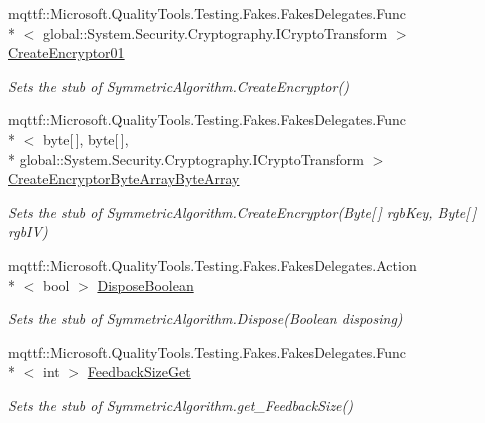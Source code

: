 \begin{DoxyCompactItemize}
mqttf\-::\-Microsoft.\-Quality\-Tools.\-Testing.\-Fakes.\-Fakes\-Delegates.\-Func\\*
$<$ global\-::\-System.\-Security.\-Cryptography.\-I\-Crypto\-Transform $>$ \hyperlink{class_system_1_1_security_1_1_cryptography_1_1_fakes_1_1_stub_symmetric_algorithm_a7e6e0267f843f233ed862731f70861bf}{Create\-Encryptor01}
\begin{DoxyCompactList}\small\item\em Sets the stub of Symmetric\-Algorithm.\-Create\-Encryptor()\end{DoxyCompactList}\item 
mqttf\-::\-Microsoft.\-Quality\-Tools.\-Testing.\-Fakes.\-Fakes\-Delegates.\-Func\\*
$<$ byte\mbox{[}$\,$\mbox{]}, byte\mbox{[}$\,$\mbox{]}, \\*
global\-::\-System.\-Security.\-Cryptography.\-I\-Crypto\-Transform $>$ \hyperlink{class_system_1_1_security_1_1_cryptography_1_1_fakes_1_1_stub_symmetric_algorithm_a988c4d07dd356c8d91f1b124d02994d0}{Create\-Encryptor\-Byte\-Array\-Byte\-Array}
\begin{DoxyCompactList}\small\item\em Sets the stub of Symmetric\-Algorithm.\-Create\-Encryptor(\-Byte\mbox{[}$\,$\mbox{]} rgb\-Key, Byte\mbox{[}$\,$\mbox{]} rgb\-I\-V)\end{DoxyCompactList}\item 
mqttf\-::\-Microsoft.\-Quality\-Tools.\-Testing.\-Fakes.\-Fakes\-Delegates.\-Action\\*
$<$ bool $>$ \hyperlink{class_system_1_1_security_1_1_cryptography_1_1_fakes_1_1_stub_symmetric_algorithm_a60a8d5e382e700431fc73137fa651964}{Dispose\-Boolean}
\begin{DoxyCompactList}\small\item\em Sets the stub of Symmetric\-Algorithm.\-Dispose(\-Boolean disposing)\end{DoxyCompactList}\item 
mqttf\-::\-Microsoft.\-Quality\-Tools.\-Testing.\-Fakes.\-Fakes\-Delegates.\-Func\\*
$<$ int $>$ \hyperlink{class_system_1_1_security_1_1_cryptography_1_1_fakes_1_1_stub_symmetric_algorithm_a333b2f0b29a96eff7e4a49ad5e066b1d}{Feedback\-Size\-Get}
\begin{DoxyCompactList}\small\item\em Sets the stub of Symmetric\-Algorithm.\-get\-\_\-\-Feedback\-Size()\end{DoxyCompactList}\item 

\end{DoxyCompactItemize}
